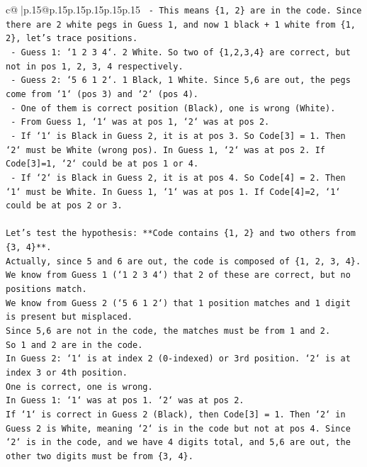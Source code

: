 \documentclass{article}
\begin{document}
{\begin{supertabular}{c@{$\;$}|p{.15\linewidth}@{}p{.15\linewidth}p{.15\linewidth}p{.15\linewidth}p{.15\linewidth}p{.15\linewidth}}
{{{\texttt{        {-} This means \{1, 2\} are in the code. Since there are 2 white pegs in Guess 1, and now 1 black + 1 white from \{1, 2\}, let's trace positions.} \\
\texttt{        {-} Guess 1: `1 2 3 4`. 2 White. So two of \{1,2,3,4\} are correct, but not in pos 1, 2, 3, 4 respectively.} \\
\texttt{        {-} Guess 2: `5 6 1 2`. 1 Black, 1 White. Since 5,6 are out, the pegs come from `1` (pos 3) and `2` (pos 4).} \\
\texttt{        {-} One of them is correct position (Black), one is wrong (White).} \\
\texttt{        {-} From Guess 1, `1` was at pos 1, `2` was at pos 2.} \\
\texttt{        {-} If `1` is Black in Guess 2, it is at pos 3. So Code{[}3{]} = 1. Then `2` must be White (wrong pos). In Guess 1, `2` was at pos 2. If Code{[}3{]}=1, `2` could be at pos 1 or 4.} \\
\texttt{        {-} If `2` is Black in Guess 2, it is at pos 4. So Code{[}4{]} = 2. Then `1` must be White. In Guess 1, `1` was at pos 1. If Code{[}4{]}=2, `1` could be at pos 2 or 3.} \\
\\ 
\texttt{Let's test the hypothesis: **Code contains \{1, 2\} and two others from \{3, 4\}**.} \\
\texttt{Actually, since 5 and 6 are out, the code is composed of \{1, 2, 3, 4\}.} \\
\texttt{We know from Guess 1 (`1 2 3 4`) that 2 of these are correct, but no positions match.} \\
\texttt{We know from Guess 2 (`5 6 1 2`) that 1 position matches and 1 digit is present but misplaced.} \\
\texttt{Since 5,6 are not in the code, the matches must be from 1 and 2.} \\
\texttt{So 1 and 2 are in the code.} \\
\texttt{In Guess 2: `1` is at index 2 (0{-}indexed) or 3rd position. `2` is at index 3 or 4th position.} \\
\texttt{One is correct, one is wrong.} \\
\texttt{In Guess 1: `1` was at pos 1. `2` was at pos 2.} \\
\texttt{If `1` is correct in Guess 2 (Black), then Code{[}3{]} = 1. Then `2` in Guess 2 is White, meaning `2` is in the code but not at pos 4. Since `2` is in the code, and we have 4 digits total, and 5,6 are out, the other two digits must be from \{3, 4\}.} \\
}}}
\end{supertabular}}
\end{document}
